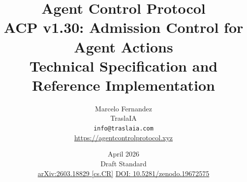 \documentclass[11pt]{article}
\theoremstyle{definition}
\begin{document}

\title{%
  \textbf{Agent Control Protocol}\\[0.4em]
  \large ACP v1.30: Admission Control for Agent Actions\\[0.3em]
  \normalsize Technical Specification and Reference Implementation%
}

\author{
  Marcelo Fernandez\\
  TraslaIA\\
  \texttt{info@traslaia.com}\\
  \url{https://agentcontrolprotocol.xyz}
}

\date{April 2026 \\ \small Draft Standard \\ \small \href{https://arxiv.org/abs/2603.18829}{arXiv:2603.18829 [cs.CR]} \quad \href{https://doi.org/10.5281/zenodo.19672575}{DOI: 10.5281/zenodo.19672575}}

\maketitle
\end{document}

